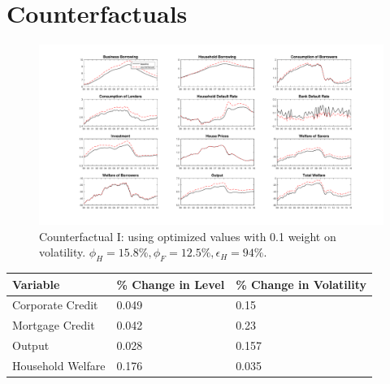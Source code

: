 \documentclass[12pt]{article}
\numberwithin{equation}{section}
\begin{document}



\newpage

\section*{Counterfactuals}


\begin{figure}[H]
\centering
\caption{Counterfactual I: using optimized values  with 0.1 weight on volatility. $\phi_H=15.8 \%, \phi_F=12.5 \%, \epsilon_H=94 \%$.}
\includegraphics[scale=0.4]{main_counterfactual.pdf}
\end{figure}

\begin{table}[h]

\begin{tabular}{l|l|l}
Variable & \% Change in Level & \% Change in Volatility \\
\hline
\hline
    Corporate Credit           &       0.049    &      0.15 \\
    Mortgage Credit            &      0.042    &       0.23 \\
    Output         &     0.028    &    0.157 \\ 
    Household Welfare       &     0.176     &     0.035\\
\end{tabular}
\end{table}
\end{document}
